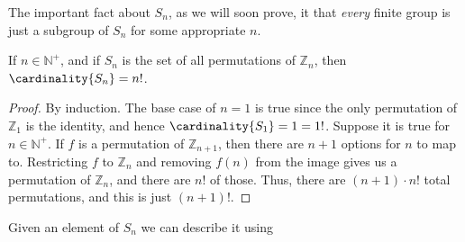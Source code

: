 \documentclass{article}                                                        %
\begin{document}
            The important fact about $S_{n}$, as we will soon prove, it that
            \textit{every} finite group is just a subgroup of $S_{n}$ for some
            appropriate $n$.
            \begin{theorem}
                \label{thm:Cardinality_of_Sn}%
                If $n\in\mathbb{N}^{+}$, and if $S_{n}$ is the set of all
                permutations of $\mathbb{Z}_{n}$, then $\cardinality{S_{n}}=n!$.
            \end{theorem}
            \begin{proof}
                By induction. The base case of $n=1$ is true since the only
                permutation of $\mathbb{Z}_{1}$ is the identity, and hence
                $\cardinality{S_{1}}=1=1!$. Suppose it is true for
                $n\in\mathbb{N}^{+}$. If $f$ is a permutation of
                $\mathbb{Z}_{n+1}$, then there are $n+1$ options for $n$ to map
                to. Restricting $f$ to $\mathbb{Z}_{n}$ and removing $f(n)$ from
                the image gives us a permutation of $\mathbb{Z}_{n}$, and there
                are $n!$ of those. Thus, there are $(n+1)\cdot{n}!$ total
                permutations, and this is just $(n+1)!$.
            \end{proof}
            Given an element of $S_{n}$ we can describe it using 
\end{document}
